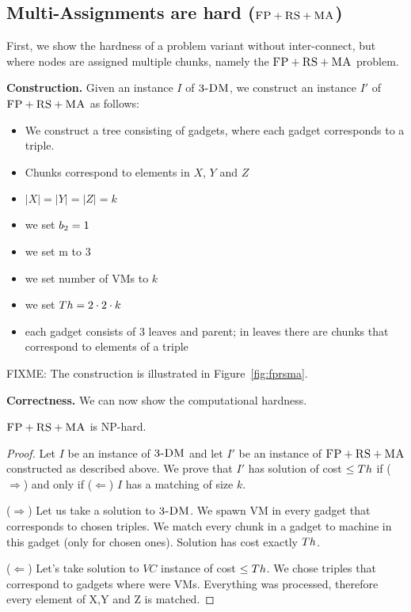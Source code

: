 \subsection{Multi-Assignments are hard ($\textsc{FP}+\textsc{RS}+\textsc{MA}$)}\label{ssec:fprsma}

First, we show the hardness of a problem variant without inter-connect,
but where nodes are assigned multiple chunks, namely the $\textsc{FP}+\textsc{RS}+\textsc{MA}$
problem.

\textbf{Construction.}
Given an instance $I$ of $\textsc{3-DM}$, we construct an instance $I'$ of
$\textsc{FP}+\textsc{RS}+\textsc{MA}$ as follows:
\begin{itemize}
\item We construct a tree consisting of gadgets, where each gadget corresponds to a triple.
\item Chunks correspond to elements in $X$, $Y$ and $Z$
\item $|X| = |Y| = |Z| = k$
\item we set $b_2=1$
\item we set m to 3
\item we set number of VMs to $k$
\item we set $Th=2 \cdot 2 \cdot k$
\item each gadget consists of 3 leaves and parent; in leaves there are
  chunks that correspond to elements of a triple
\end{itemize}

FIXME: The construction is illustrated in Figure~\ref{fig:fprsma}.

\textbf{Correctness.}
We can now show the computational hardness.
\begin{theorem}
$\textsc{FP}+\textsc{RS}+\textsc{MA}$ is NP-hard.
\end{theorem}
\begin{proof}
Let $I$ be an instance of $\textsc{3-DM}$ and let $I'$ be an instance of
$\textsc{FP}+\textsc{RS}+\textsc{MA}$ constructed as described above.
We prove that $I'$ has solution of cost $\leq Th$ if ($\Rightarrow$) and only if
($\Leftarrow$)
$I$ has a matching of size $k$.

($\Rightarrow$) Let us take a solution to $\textsc{3-DM}$. We spawn VM in every
gadget that corresponds to chosen triples. We match every chunk in a
gadget to machine in this gadget (only for chosen ones). Solution has
cost exactly $Th$.

($\Leftarrow$) Let's take solution to $VC$ instance of cost $\leq Th$. We
chose triples that correspond to gadgets where were VMs. Everything
was processed, therefore every element of X,Y and Z is matched.
\end{proof}


